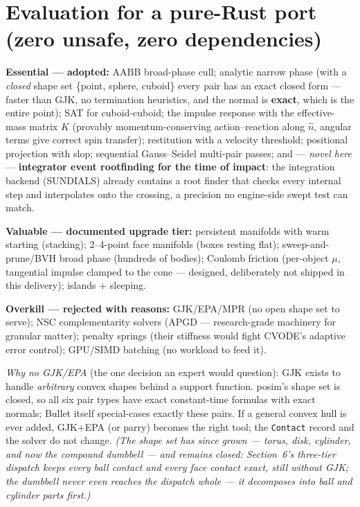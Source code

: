 \documentclass[11pt]{article}
\newcommand{\code}[1]{\texttt{#1}}
\begin{document}
\section{Evaluation for a pure-Rust port (zero unsafe, zero dependencies)}

\textbf{Essential --- adopted:} AABB broad-phase cull; analytic narrow phase
(with a \emph{closed} shape set \{point, sphere, cuboid\} every pair has an
exact closed form --- faster than GJK, no termination heuristics, and the
normal is \textbf{exact}, which is the entire point); SAT for cuboid-cuboid;
the impulse response with the effective-mass matrix $K$ (provably
momentum-conserving action--reaction along $\hat n$, angular terms give correct
spin transfer); restitution with a velocity threshold; positional projection
with slop; sequential Gauss--Seidel multi-pair passes; and --- \emph{novel
here} --- \textbf{integrator event rootfinding for the time of impact}: the
integration backend (SUNDIALS) already contains a root finder that checks every
internal step and interpolates onto the crossing, a precision no engine-side
swept test can match.

\textbf{Valuable --- documented upgrade tier:} persistent manifolds with warm
starting (stacking); 2--4-point face manifolds (boxes resting flat);
sweep-and-prune/BVH broad phase (hundreds of bodies); Coulomb friction
(per-object $\mu$, tangential impulse clamped to the cone --- designed,
deliberately not shipped in this delivery); islands + sleeping.

\textbf{Overkill --- rejected with reasons:} GJK/EPA/MPR (no open shape set to
serve); NSC complementarity solvers (APGD --- research-grade machinery for
granular matter); penalty springs (their stiffness would fight CVODE's adaptive
error control); GPU/SIMD batching (no workload to feed it).

\emph{Why no GJK/EPA} (the one decision an expert would question): GJK exists
to handle \emph{arbitrary} convex shapes behind a support function. posim's
shape set is closed, so all six pair types have exact constant-time formulas
with exact normals; Bullet itself special-cases exactly these pairs. If a
general convex hull is ever added, GJK+EPA (or parry) becomes the right tool;
the \code{Contact} record and the solver do not change. \emph{(The shape set
has since grown --- torus, disk, cylinder, and now the compound dumbbell ---
and remains closed: Section~6's three-tier dispatch keeps every ball contact
and every face contact exact, still without GJK; the dumbbell never even
reaches the dispatch whole --- it decomposes into ball and cylinder parts
first.)}
\end{document}
